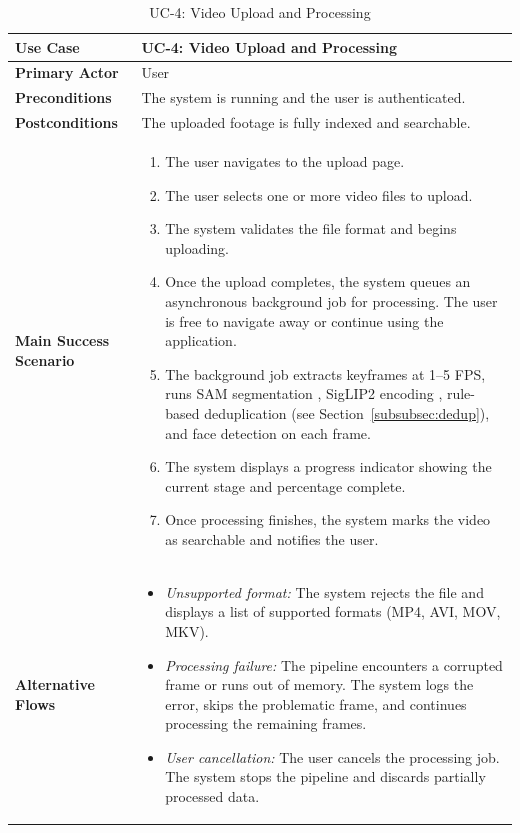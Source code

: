 \begin{table}[H]
\centering
\begin{tabular}{|l|p{10cm}|}
\hline
\textbf{Use Case}       & UC-4: Video Upload and Processing \\ \hline
\textbf{Primary Actor}   & User \\ \hline
\textbf{Preconditions}   & The system is running and the user is authenticated. \\ \hline
\textbf{Postconditions}  & The uploaded footage is fully indexed and searchable. \\ \hline
\textbf{Main Success Scenario} &
    \begin{enumerate}[nosep, leftmargin=*]
        \item The user navigates to the upload page.
        \item The user selects one or more video files to upload.
        \item The system validates the file format and begins uploading.
        \item Once the upload completes, the system queues an asynchronous background job for processing. The user is free to navigate away or continue using the application.
        \item The background job extracts keyframes at 1--5 FPS, runs SAM segmentation \cite{kirillov2023segment}, SigLIP2 encoding \cite{zhai2025siglip2}, rule-based deduplication (see Section~\ref{subsubsec:dedup}), and face detection \cite{deng2019arcface} on each frame.
        \item The system displays a progress indicator showing the current stage and percentage complete.
        \item Once processing finishes, the system marks the video as searchable and notifies the user.
    \end{enumerate} \\ \hline
\textbf{Alternative Flows} &
    \begin{itemize}[nosep, leftmargin=*]
        \item \textit{Unsupported format:} The system rejects the file and displays a list of supported formats (MP4, AVI, MOV, MKV).
        \item \textit{Processing failure:} The pipeline encounters a corrupted frame or runs out of memory. The system logs the error, skips the problematic frame, and continues processing the remaining frames.
        \item \textit{User cancellation:} The user cancels the processing job. The system stops the pipeline and discards partially processed data.
    \end{itemize} \\ \hline
\end{tabular}
\caption{UC-4: Video Upload and Processing}
\label{tab:uc4}
\end{table}

